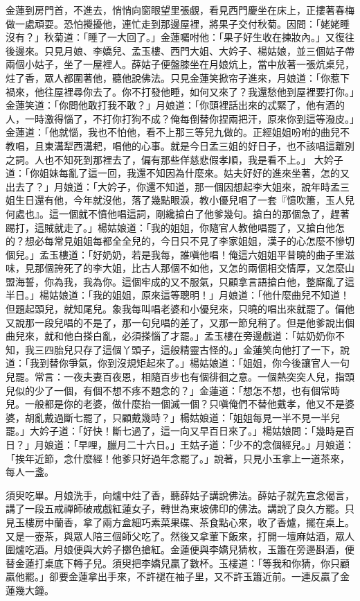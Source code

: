 金蓮到房門首，不進去，悄悄向窗眼望里張覷，看見西門慶坐在床上，正摟著春梅做一處頑耍。恐怕攪擾他，連忙走到那邊屋裡，將果子交付秋菊。因問：「姥姥睡沒有？」秋菊道：「睡了一大回了。」金蓮囑咐他：「果子好生收在揀妝內。」又復往後邊來。只見月娘、李嬌兒、孟玉樓、西門大姐、大妗子、楊姑娘，並三個姑子帶兩個小姑子，坐了一屋裡人。薛姑子便盤膝坐在月娘炕上，當中放著一張炕桌兒，炷了香，眾人都圍著他，聽他說佛法。只見金蓮笑掀帘子進來，月娘道：「你惹下禍來，他往屋裡尋你去了。你不打發他睡，如何又來了？我還愁他到屋裡要打你。」金蓮笑道：「你問他敢打我不敢？」月娘道：「你頭裡話出來的忒緊了，他有酒的人，一時激得惱了，不打你打狗不成？俺每倒替你捏兩把汗，原來你到這等潑皮。」金蓮道：「他就惱，我也不怕他，看不上那三等兒九做的。正經姐姐吩咐的曲兒不教唱，且東溝犁西溝耙，唱他的心事。就是今日孟三姐的好日子，也不該唱這離別之詞。人也不知死到那裡去了，偏有那些佯慈悲假孝順，我是看不上。」 大妗子道：「你姐妹每亂了這一回，我還不知因為什麼來。姑夫好好的進來坐著，怎的又出去了？」月娘道：「大妗子，你還不知道，那一個因想起李大姐來，說年時孟三姐生日還有他，今年就沒他，落了幾點眼淚，教小優兒唱了一套『憶吹簫，玉人兒何處也』。這一個就不憤他唱這詞，剛纔搶白了他爹幾句。搶白的那個急了，趕著踢打，這賊就走了。」楊姑娘道：「我的姐姐，你隨官人教他唱罷了，又搶白他怎的？想必每常見姐姐每都全全兒的，今日只不見了李家姐姐，漢子的心怎麼不慘切個兒。」孟玉樓道：「好奶奶，若是我每，誰嗔他唱！俺這六姐姐平昔曉的曲子里滋味，見那個誇死了的李大姐，比古人那個不如他，又怎的兩個相交情厚，又怎麼山盟海誓，你為我，我為你。這個牢成的又不服氣，只顧拿言語搶白他，整廝亂了這半日。」楊姑娘道：「我的姐姐，原來這等聰明！」月娘道：「他什麼曲兒不知道！但題起頭兒，就知尾兒。象我每叫唱老婆和小優兒來，只曉的唱出來就罷了。偏他又說那一段兒唱的不是了，那一句兒唱的差了，又那一節兒稍了。但是他爹說出個曲兒來，就和他白搽白亂，必須搽惱了才罷。」孟玉樓在旁邊戲道：「姑奶奶你不知，我三四胎兒只存了這個丫頭子，這般精靈古怪的。」金蓮笑向他打了一下，說道：「我到替你爭氣，你到沒規矩起來了。」楊姑娘道：「姐姐，你今後讓官人一句兒罷。常言：一夜夫妻百夜恩，相隨百步也有個徘徊之意。一個熱突突人兒，指頭兒似的少了一個，有個不想不疼不題念的？」金蓮道：「想怎不想，也有個常時兒。一般都是你的老婆，做什麼抬一個滅一個？只嗔俺們不替他戴孝，他又不是婆婆，胡亂戴過斷七罷了，只顧戴幾時？」楊姑娘道：「姐姐每見一半不見一半兒罷。」大妗子道：「好快！斷七過了，這一向又早百日來了。」楊姑娘問：「幾時是百日？」月娘道：「早哩，臘月二十六日。」王姑子道：「少不的念個經兒。」月娘道：「挨年近節，念什麼經！他爹只好過年念罷了。」說著，只見小玉拿上一道茶來，每人一盞。

須臾吃畢。月娘洗手，向爐中炷了香，聽薛姑子講說佛法。薛姑子就先宣念偈言，講了一段五戒禪師破戒戲紅蓮女子，轉世為東坡佛印的佛法。講說了良久方罷。只見玉樓房中蘭香，拿了兩方盒細巧素菜果碟、茶食點心來，收了香爐，擺在桌上。又是一壺茶，與眾人陪三個師父吃了。然後又拿葷下飯來，打開一壇麻姑酒，眾人圍爐吃酒。月娘便與大妗子擲色搶紅。金蓮便與李嬌兒猜枚，玉簫在旁邊斟酒，便替金蓮打桌底下轉子兒。須臾把李嬌兒贏了數杯。玉樓道：「等我和你猜，你只顧贏他罷。」卻要金蓮拿出手來，不許褪在袖子里，又不許玉簫近前。一連反贏了金蓮幾大鐘。

